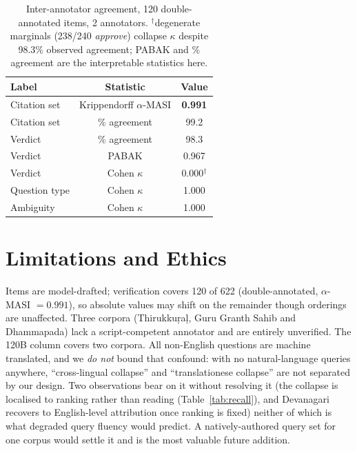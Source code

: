 \documentclass[11pt]{article}
\begin{document}
\begin{table}[t]
\centering\small
\begin{tabular}{@{}lcc@{}}
\toprule
\textbf{Label} & \textbf{Statistic} & \textbf{Value} \\
\midrule
Citation set & Krippendorff $\alpha$-MASI & \textbf{0.991} \\
Citation set & \% agreement & 99.2 \\
Verdict & \% agreement & 98.3 \\
Verdict & PABAK & 0.967 \\
Verdict & Cohen $\kappa$ & 0.000$^\dagger$ \\
Question type & Cohen $\kappa$ & 1.000 \\
Ambiguity & Cohen $\kappa$ & 1.000 \\
\bottomrule
\end{tabular}
\caption{Inter-annotator agreement, 120 double-annotated items, 2 annotators.
$^\dagger$degenerate marginals (238/240 \emph{approve}) collapse $\kappa$ despite
98.3\% observed agreement; PABAK and \% agreement are the interpretable
statistics here.}
\label{tab:agreement}
\end{table}

\section{Limitations and Ethics}

Items are model-drafted; verification covers 120 of 622 (double-annotated,
$\alpha$-MASI $=0.991$), so absolute values may shift on the remainder though
orderings are unaffected. Three corpora (Thirukku\d{r}a\d{l}, Guru Granth
Sahib and Dhammapada) lack a script-competent annotator and are entirely
unverified. The 120B column
covers two corpora. All non-English questions are machine translated, and we
\emph{do not} bound that confound: with no natural-language queries anywhere,
``cross-lingual collapse'' and ``translationese collapse'' are not separated by
our design. Two observations bear on it without resolving it (the collapse is
localised to ranking rather than reading (Table~\ref{tab:recall}), and Devanagari
recovers to English-level attribution once ranking is fixed) neither of which is
what degraded query fluency would predict. A natively-authored query set for one
corpus would settle it and is the most valuable future addition.
\end{document}
